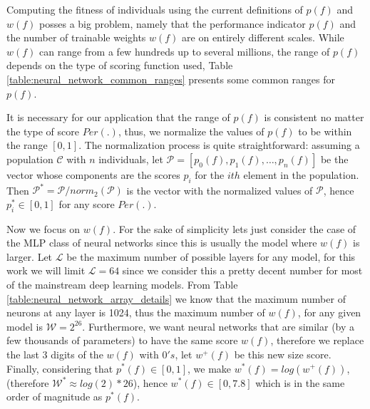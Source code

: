 \documentclass[journal]{IEEEtran}
\begin{document}
Computing the fitness of individuals using the current definitions of $p(f)$ and $w(f)$ posses a big problem, namely that the performance indicator $p(f)$ and the number of trainable weights $w(f)$ are on entirely different scales. While $w(f)$ can range from a few hundreds up to several millions, the range of $p(f)$ depends on the type of scoring function used, Table \ref{table:neural_network_common_ranges} presents some common ranges for $p(f)$. 

\begin{table}[!htb]
\begin{center}
\end{center}
\caption{Common ranges for some neural network performance indicators.}
\label{table:neural_network_common_ranges}
\end{table}

It is necessary for our application that the range of $p(f)$ is consistent no matter the type of score $Per(.)$, thus, we normalize the values of $p(f)$ to be within the range $\left[ 0,1 \right]$. The normalization process is quite straightforward: assuming a population $\mathcal{C}$ with $n$ individuals, let $\mathcal{P} = \left[ p_0(f), p_1(f), \ldots, p_n(f) \right]$ be the vector whose components are the scores $p_i$ for the $ith$ element in the population. Then $\mathcal{P}^* = \mathcal{P}/norm_2(\mathcal{P})$ is the vector with the normalized values of $\mathcal{P}$, hence $p^*_i \in \left[ 0, 1 \right]$ for any score $Per(.)$.

Now we focus on $w(f)$. For the sake of simplicity lets just consider the case of the MLP class of neural networks since this is usually the model where $w(f)$ is larger. Let $\mathcal{L}$ be the maximum number of possible layers for any model, for this work we will limit $\mathcal{L} = 64$ since we consider this a pretty decent number for most of the mainstream deep learning models. From Table \ref{table:neural_network_array_details} we know that the maximum number of neurons at any layer is 1024, thus the maximum number of $w(f)$, for any given model is $\mathcal{W} = 2^{26}$. Furthermore, we want neural networks that are similar (by a few thousands of parameters) to have the same score $w(f)$, therefore we replace the last 3 digits of the $w(f)$ with $0's$, let $w^+(f)$ be this new size score. Finally, considering that $p^*(f) \in \left[ 0, 1 \right]$, we make $w^*(f) = log(w^+(f))$, (therefore $\mathcal{W}^* \approx  log(2)*26$), hence $w^*(f) \in \left[0, 7.8\right]$ which is in the same order of magnitude as $p^*(f)$.
\end{document}
